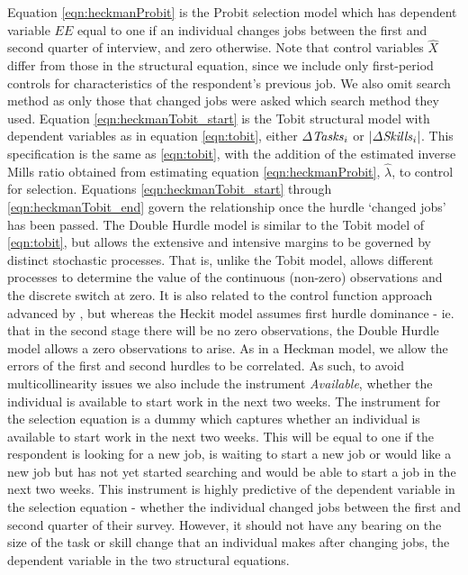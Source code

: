 \documentclass[11pt, oneside]{article}
\begin{document}
Equation \ref{eqn:heckmanProbit} is the Probit selection model which has dependent variable $EE$ equal to one if an individual changes jobs between the first and second quarter of interview, and zero otherwise. Note that control variables $\hat{X}$ differ from those in the structural equation, since we include only first-period controls for characteristics of the respondent's previous job. We also omit search method as only those that changed jobs were asked which search method they used.  Equation \ref{eqn:heckmanTobit_start} is the Tobit structural model with dependent variables as in equation \ref{eqn:tobit}, either $\Delta\text{\textit{Tasks}}_{i}$ or $|\Delta\text{\textit{Skills}}_{i}|$. This specification is the same as \ref{eqn:tobit}, with the addition of the estimated inverse Mills ratio obtained from estimating equation \ref{eqn:heckmanProbit}, $\hat{\lambda}$, to control for selection. Equations \ref{eqn:heckmanTobit_start} through \ref{eqn:heckmanTobit_end} govern the relationship once the hurdle `changed jobs' has been passed.  The Double Hurdle model is similar to the Tobit model of \ref{eqn:tobit}, but allows the extensive and intensive margins to be governed by distinct stochastic processes. That is, unlike the Tobit model, allows different processes to determine the value of the continuous (non-zero) observations and the discrete switch at zero. It is also related to the control function approach advanced by \cite{Heckman}, but whereas the Heckit model assumes first hurdle dominance - ie. that in the second stage there will be no zero observations, the Double Hurdle model allows a zero observations to arise. As in a Heckman model, we allow the errors of the first and second hurdles to be correlated. As such, to avoid multicollinearity issues we also include the instrument \textit{Available}, whether the individual is available to start work in the next two weeks. The instrument for the selection equation is a dummy which captures whether an individual is available to start work in the next two weeks. This will be equal to one if the respondent is looking for a new job, is waiting to start a new job or would like a new job but has not yet started searching and would be able to start a job in the next two weeks. This instrument is highly predictive of the dependent variable in the selection equation - whether the individual changed jobs between the first and second quarter of their survey. However, it should not have any bearing on the size of the task or skill change that an individual makes after changing jobs, the dependent variable in the two structural equations. 
	
\end{document}
